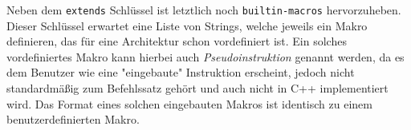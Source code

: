 Neben dem \texttt{extends} Schlüssel ist letztlich noch \texttt{builtin-macros}
hervorzuheben. Dieser Schlüssel erwartet eine Liste von Strings, welche jeweils
ein Makro definieren, das für eine Architektur schon vordefiniert ist. Ein
solches vordefiniertes Makro kann hierbei auch \emph{Pseudoinstruktion} genannt
werden, da es dem Benutzer wie eine "eingebaute" Instruktion erscheint, jedoch
nicht standardmäßig zum Befehlssatz gehört und auch nicht in C++ implementiert
wird. Das Format eines solchen eingebauten Makros ist identisch zu einem benutzerdefinierten Makro.
